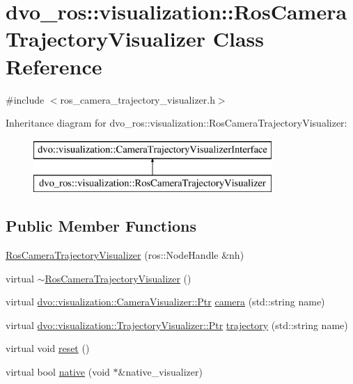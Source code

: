 \hypertarget{classdvo__ros_1_1visualization_1_1_ros_camera_trajectory_visualizer}{}\section{dvo\+\_\+ros\+:\+:visualization\+:\+:Ros\+Camera\+Trajectory\+Visualizer Class Reference}
\label{classdvo__ros_1_1visualization_1_1_ros_camera_trajectory_visualizer}


{\ttfamily \#include $<$ros\+\_\+camera\+\_\+trajectory\+\_\+visualizer.\+h$>$}

Inheritance diagram for dvo\+\_\+ros\+:\+:visualization\+:\+:Ros\+Camera\+Trajectory\+Visualizer\+:\begin{figure}[H]
\begin{center}
\leavevmode
\includegraphics[height=2.000000cm]{classdvo__ros_1_1visualization_1_1_ros_camera_trajectory_visualizer}
\end{center}
\end{figure}
\subsection*{Public Member Functions}
\begin{DoxyCompactItemize}
\item 
\mbox{\hyperlink{classdvo__ros_1_1visualization_1_1_ros_camera_trajectory_visualizer_ac1ea5f7ec4b70001b9f10ff7ebfe5196}{Ros\+Camera\+Trajectory\+Visualizer}} (ros\+::\+Node\+Handle \&nh)
\item 
virtual \mbox{\hyperlink{classdvo__ros_1_1visualization_1_1_ros_camera_trajectory_visualizer_a06555d4a1a53b4deda6f86fde360ca73}{$\sim$\+Ros\+Camera\+Trajectory\+Visualizer}} ()
\item 
virtual \mbox{\hyperlink{classdvo_1_1visualization_1_1_camera_visualizer_a473ebecc62e1d4edba21027d858789a2}{dvo\+::visualization\+::\+Camera\+Visualizer\+::\+Ptr}} \mbox{\hyperlink{classdvo__ros_1_1visualization_1_1_ros_camera_trajectory_visualizer_a9595c8a8bfceffb2da725b462569404c}{camera}} (std\+::string name)
\item 
virtual \mbox{\hyperlink{classdvo_1_1visualization_1_1_trajectory_visualizer_aac33ef5979fe64ee33409f1afa977fd3}{dvo\+::visualization\+::\+Trajectory\+Visualizer\+::\+Ptr}} \mbox{\hyperlink{classdvo__ros_1_1visualization_1_1_ros_camera_trajectory_visualizer_a3a015885211d1dfac2441ab5f0e26af5}{trajectory}} (std\+::string name)
\item 
virtual void \mbox{\hyperlink{classdvo__ros_1_1visualization_1_1_ros_camera_trajectory_visualizer_a1900ce8a2c17014fef1a4375d8fd6e92}{reset}} ()
\item 
virtual bool \mbox{\hyperlink{classdvo__ros_1_1visualization_1_1_ros_camera_trajectory_visualizer_a2e5c80d7dc8308ac038be2e4b71f4e25}{native}} (void $\ast$\&native\+\_\+visualizer)
\end{DoxyCompactItemize}


